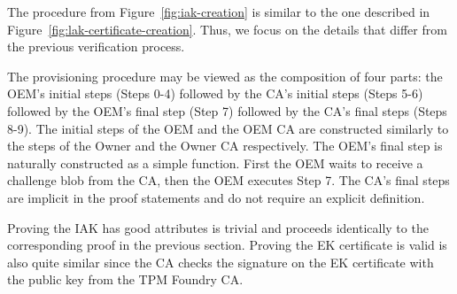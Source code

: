 \documentclass[runningheads]{llncs}
\begin{document}



The procedure from Figure~\ref{fig:iak-creation} is similar to the one
described in Figure~\ref{fig:lak-certificate-creation}. 
Thus, we focus on the details that differ from
the previous verification process.

The provisioning procedure may be viewed as the composition of four
parts: the OEM's initial steps (Steps 0-4) followed by the CA's
initial steps (Steps 5-6) followed by the OEM's final step (Step 7)
followed by the CA's final steps (Steps 8-9). The initial steps of the
OEM and the OEM CA are constructed similarly to the steps of the
Owner and the Owner CA respectively.  The OEM's final step is
naturally constructed as a simple function. First the OEM waits to
receive a challenge blob from the CA, then the OEM executes Step
7. The CA's final steps are implicit in the proof statements and do
not require an explicit definition.

Proving the IAK has good attributes is trivial and proceeds
identically to the corresponding proof in the previous
section. Proving the EK certificate is valid is also quite similar
since the CA checks the signature on the EK certificate with the
public key from the TPM Foundry CA.
\end{document}
